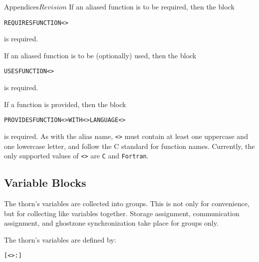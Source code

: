 \begin{cactuspart}{Appendices}{}{$Revision$}
If an aliased function is to be required, then the block
\begin{alltt}
REQUIRES FUNCTION <>
\end{alltt}
is required.

If an aliased function is to be (optionally) used, then the block
\begin{alltt}
USES FUNCTION <>
\end{alltt}
is required.

If a function is provided, then the block
\begin{alltt}
PROVIDES FUNCTION <> WITH <> LANGUAGE <>
\end{alltt}
is required. As with the alias name, \texttt{<>} must contain at
least one uppercase and one lowercase letter, and follow the C standard
for function names. Currently, the only supported values of
\texttt{<>} are \verb|C| and \verb|Fortran|.


\subsection{Variable Blocks}
\label{subsec:Appendix.interface-variables}
The thorn's variables are collected into groups. This is not only
for convenience, but for collecting like variables together.
Storage assignment, communication assignment, and ghostzone synchronization
take place for groups only.

The thorn's variables are defined by:

\begin{alltt}
[<>:]


\end{alltt}
\end{cactuspart}
